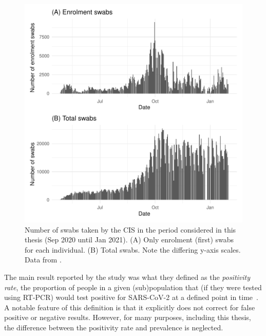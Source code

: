 \documentclass[thesis.tex]{subfiles}
\begin{document}
\begin{figure}
  \centering \includegraphics{biology-data/CIS-recruitment}
  \caption[CIS swab numbers]{%
    Number of swabs taken by the CIS in the period considered in this thesis (Sep 2020 until Jan 2021).
    (A) Only enrolment (\ie first) swabs for each individual.
    (B) Total swabs.
    Note the differing y-axis scales.
    Data from \textcite{CIStechData}.
  }
  \label{biology-data:fig:CIS-recruitment}
\end{figure}


The main result reported by the study was what they defined as the \emph{positivity rate}, the proportion of people in a given (sub)population that (if they were tested using RT-PCR) would test positive for SARS-CoV-2 at a defined point in time~\autocite{cisMethodsONS}.
A notable feature of this definition is that it explicitly does not correct for false positive or negative results.
However, for many purposes, including this thesis, the difference between the positivity rate and prevalence is neglected.
\end{document}
